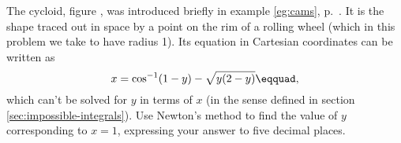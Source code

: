 The cycloid, figure , was introduced briefly in example \ref{eg:cams}, p.~\pageref{eg:cams}.
It is the shape traced out in space by a point on the rim of a rolling wheel (which in this
problem we take to have radius 1).
Its equation in Cartesian coordinates can be written as
\begin{equation*}
  x = \cos^{-1}(1-y)-\sqrt{y(2-y)}\eqquad,
\end{equation*}
which can't be solved for $y$ in terms of $x$ (in the sense defined in section \ref{sec:impossible-integrals}).
Use Newton's method to find the value of $y$ corresponding to $x=1$, expressing your answer to five
decimal places.
\answercheck
